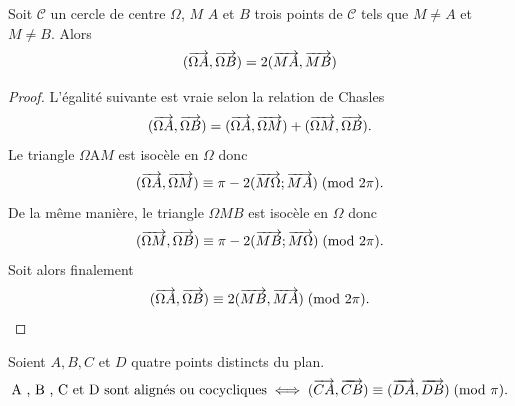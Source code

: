\begin{prop}
  \label{prop:cocy}
  Soit \(\mathcal{C}\) un cercle de centre \(\Omega\), \(M\) \(A\) et \(B\)
  trois points de \(\mathcal{C}\) tels que \(M \neq A\) et \(M \neq B\). Alors
  \begin{equation}
    (\overrightarrow{\Omega A},\overrightarrow{\Omega B}) = 2 (\overrightarrow{MA},\overrightarrow{MB})
  \end{equation}
\end{prop}

\begin{proof}
  L'égalité suivante est vraie selon la relation de Chasles
  \begin{equation}
    (\overrightarrow{\Omega A},\overrightarrow{\Omega B}) = (\overrightarrow{\Omega A},\overrightarrow{\Omega M}) +
    (\overrightarrow{\Omega M},\overrightarrow{\Omega B}).
  \end{equation}
  Le triangle \(\Omega \)A\( M\) est isocèle en \(\Omega\) donc
  \begin{equation}
    (\overrightarrow{\Omega A}, \overrightarrow{\Omega M}) \equiv \pi - 2 (\overrightarrow{M\Omega};
    \overrightarrow{MA})\!\pmod {2\pi}.
  \end{equation}
  De la même manière, le triangle \(\Omega M B\) est isocèle en \(\Omega\)
  donc
  \begin{equation}
    (\overrightarrow{\Omega M}, \overrightarrow{\Omega B}) \equiv \pi - 2 (\overrightarrow{MB};
    \overrightarrow{M\Omega})\!\pmod {2\pi}.
  \end{equation}
  Soit alors finalement \begin{equation}
    (\overrightarrow{\Omega A}, \overrightarrow{\Omega B}) \equiv 2 (\overrightarrow{MB},
    \overrightarrow{MA})\!\pmod {2\pi}.
  \end{equation}
\end{proof}

\begin{theo}
  Soient \(A , B , C\) et \(D\) quatre points distincts du plan.
  \begin{equation}
    \text{A , B , C et D sont alignés ou cocycliques} \iff (\overrightarrow{CA},
    \overrightarrow{CB}) \equiv (\overrightarrow{DA}, \overrightarrow{DB})\!\pmod {\pi}.
  \end{equation}
\end{theo}

